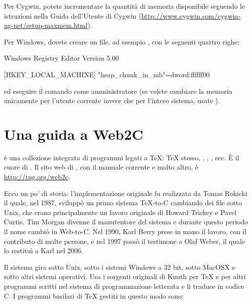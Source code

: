 \documentclass{article}
\begin{document}
Per Cygwin, potete incrementare la quantità di memoria disponibile seguendo
le istruzioni nella Guida dell'Utente di Cygwin
(\url{http://www.cygwin.com/cygwin-ug-net/setup-maxmem.html}).

Per Windows, dovete creare un file, ad esempio , con le
seguenti quattro righe:

\begin{sverbatim}
Windows Registry Editor Version 5.00

[HKEY_LOCAL_MACHINE\Software\Cygwin]
"heap_chunk_in_mb"=dword:ffffff00
\end{sverbatim}

\noindent ed eseguire il comando  come
amministratore (se volete cambiare la memoria unicamente per l'utente
corrente invece che per l'intero sistema, usate ).


\section{Una guida a Web2C}

\Webc{} è una collezione integrata di programmi legati a \TeX: \TeX{}
stesso, \MF{}, \MP, \BibTeX{}, ecc. È il cuore di \TL{}. Il sito web di
\Webc{}, con il manuale corrente e molto altro, è
\url{http://tug.org/web2c}.

Ecco un po' di storia: l'implementazione originale fu realizzata da Tomas
Rokicki il quale, nel 1987, sviluppò un primo sistema \TeX{}-to-C
cambiando dei file sotto Unix, che erano principalmente un lavoro
originale di Howard Trickey e Pavel Curtis. Tim Morgan divenne il
manutentore del sistema e durante questo periodo il nome cambiò in
Web-to-C\@. Nel 1990, Karl Berry prese in mano il lavoro, con il
contributo di molte persone, e nel 1997 passò il testimone a Olaf Weber,
il quale lo restituì a Karl nel 2006.

Il sistema \Webc{} gira sotto Unix, sotto i sistemi Windows a 32 bit,
sotto MacOSX{} e sotto altri sistemi operativi. Usa i sorgenti originali
di Knuth per \TeX{} e per altri programmi scritti nel sistema di
programmazione letterata \web{} e li traduce in codice C. I programmi
basilari di \TeX{} gestiti in questo modo sono:
\end{document}

